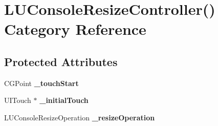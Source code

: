 \hypertarget{category_l_u_console_resize_controller_07_08}{}\section{L\+U\+Console\+Resize\+Controller() Category Reference}
\label{category_l_u_console_resize_controller_07_08}
\subsection*{Protected Attributes}
\begin{DoxyCompactItemize}
\item 
\mbox{\label{category_l_u_console_resize_controller_07_08_a6fe61b04ca3fb8410d1822bf3fab1a85}} 
C\+G\+Point {\bfseries \+\_\+touch\+Start}
\item 
\mbox{\label{category_l_u_console_resize_controller_07_08_a1a03ab4881afe6abd060491899f0829f}} 
U\+I\+Touch $\ast$ {\bfseries \+\_\+initial\+Touch}
\item 
\mbox{\label{category_l_u_console_resize_controller_07_08_ae8dc3fab807402deade65e370ff53a6e}} 
L\+U\+Console\+Resize\+Operation {\bfseries \+\_\+resize\+Operation}
\end{DoxyCompactItemize}
